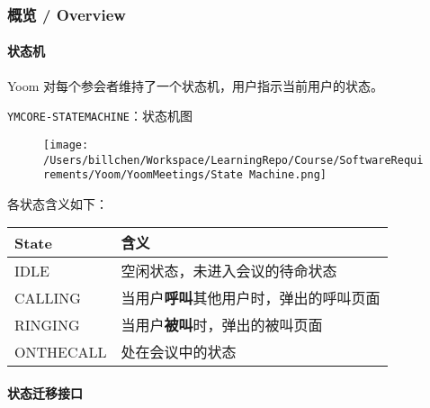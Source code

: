 \documentclass[]{ctexart}
\let\oldparagraph\paragraph
\renewcommand{\paragraph}[1]{\oldparagraph{#1}\mbox{}}
\begin{document}
\hypertarget{ux6982ux89c8--overview}{%
\subsubsection{概览 / Overview}\label{ux6982ux89c8--overview}}

\hypertarget{ux72b6ux6001ux673a}{%
\paragraph{状态机}\label{ux72b6ux6001ux673a}}

Yoom 对每个参会者维持了一个状态机，用户指示当前用户的状态。

\texttt{YMCORE-STATEMACHINE}：状态机图

\begin{figure}
\centering
\texttt{[image: /Users/billchen/Workspace/LearningRepo/Course/SoftwareRequirements/Yoom/YoomMeetings/State Machine.png]}
\caption{}
\end{figure}

各状态含义如下：

\begin{longtable}[]{@{}ll@{}}
\toprule
State & 含义\tabularnewline
\midrule
\endhead
IDLE & 空闲状态，未进入会议的待命状态\tabularnewline
CALLING & 当用户\textbf{呼叫}其他用户时，弹出的呼叫页面\tabularnewline
RINGING & 当用户\textbf{被叫}时，弹出的被叫页面\tabularnewline
ONTHECALL & 处在会议中的状态\tabularnewline
\bottomrule
\end{longtable}

\hypertarget{ux72b6ux6001ux8fc1ux79fbux63a5ux53e3}{%
\paragraph{状态迁移接口}\label{ux72b6ux6001ux8fc1ux79fbux63a5ux53e3}}
\end{document}
